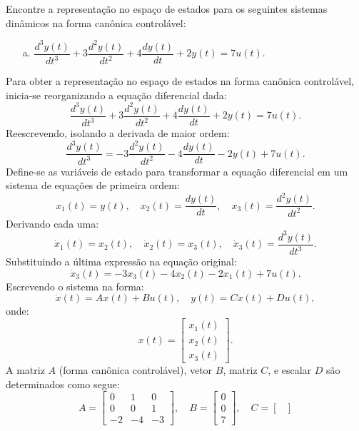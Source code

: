 \begin{question}
  Encontre a representação no espaço de estados para os seguintes sistemas dinâmicos na forma canônica controlável:
  \begin{itemize}
    \item[a.] $\dfrac{d^3 y(t)}{dt^3} + 3 \dfrac{d^2 y(t)}{dt^2} + 4 \dfrac{dy(t)}{dt} + 2y(t) = 7u(t)$.
  \end{itemize}
\end{question}

\begin{resolution}
  Para obter a representação no espaço de estados na forma canônica controlável, inicia-se reorganizando a equação diferencial dada:
  \[
    \frac{d^3 y(t)}{dt^3} + 3\frac{d^2 y(t)}{dt^2} + 4\frac{dy(t)}{dt} + 2y(t) = 7u(t).
  \]
  Reescrevendo, isolando a derivada de maior ordem:
  \[
    \frac{d^3 y(t)}{dt^3} = -3\frac{d^2 y(t)}{dt^2} - 4\frac{dy(t)}{dt} - 2y(t) + 7u(t).
  \]
  Define-se as variáveis de estado para transformar a equação diferencial em um sistema de equações de primeira ordem:
  \[
    x_1(t) = y(t), \quad x_2(t) = \frac{dy(t)}{dt}, \quad x_3(t) = \frac{d^2 y(t)}{dt^2}.
  \]
  Derivando cada uma:
  \[
    \dot{x}_1(t) = x_2(t), \quad \dot{x}_2(t) = x_3(t), \quad \dot{x}_3(t) = \frac{d^3 y(t)}{dt^3}.
  \]
  Substituindo a última expressão na equação original:
  \[
    \dot{x}_3(t) = -3x_3(t) - 4x_2(t) - 2x_1(t) + 7u(t).
  \]
  Escrevendo o sistema na forma:
  \[
    \dot{{x}}(t) = A{x}(t) + B u(t), \quad y(t) = C{x}(t) + D u(t),
  \]
  onde:
  \[
    {x}(t) = \begin{bmatrix}
      x_1(t) \\ x_2(t) \\ x_3(t)
    \end{bmatrix}.
  \]
  A matriz \( A \) (forma canônica controlável), vetor \( B \), matriz \( C \), e escalar \( D \) são determinados como segue:
  \[
    A = \begin{bmatrix}
      0  & 1  & 0  \\
      0  & 0  & 1  \\
      -2 & -4 & -3
    \end{bmatrix}, \quad
    B = \begin{bmatrix}
      0 \\ 0 \\ 7
    \end{bmatrix}, \quad
    C = \begin{bmatrix}

\end{bmatrix}\]
\end{resolution}
